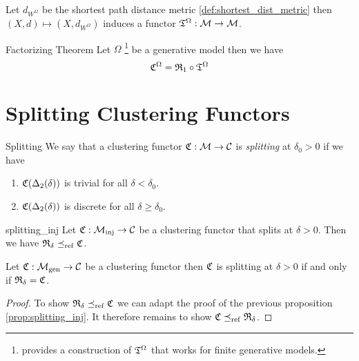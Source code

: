 \begin{myremark}{}{}
Let $d_{W^\Omega}$ be the shortest path distance metric \ref{def:shortest_dist_metric} then $(X,d) \mapsto (X,d_{W^\Omega})$ induces a functor $\mathfrak{T}^\Omega: \mathcal{M} \to \mathcal{M}$.
\end{myremark}

\begin{theorem}{Factorizing Theorem}{}
Let $\Omega$ \footnote{\cite{Carlsson2010} provides a construction of $\mathfrak{T}^\Omega$ that works for finite generative models.} be a generative model then we have
\begin{equation*}
\mathfrak{C}^\Omega = \mathfrak{R}_1 \circ \mathfrak{T}^\Omega
\end{equation*}
\end{theorem}

\section{Splitting Clustering Functors}

\begin{definition}{Splitting}{}
We say that a clustering functor $\mathfrak{C}: \mathcal{M} \to \mathcal{C}$ is \emph{splitting} at $\delta_0 > 0$ if we have

\begin{enumerate}
    \item $\mathfrak{C}(\Delta_2(\delta))$ is trivial for all $\delta < \delta_0$.
    \item $\mathfrak{C}(\Delta_2(\delta))$ is discrete for all $\delta \geq \delta_0$.
\end{enumerate}

\end{definition}

\begin{proposition}{}{splitting_inj}
Let $\mathfrak{C}: {\mathcal{M}_\mathrm{inj}} \to \mathcal{C}$ be a clustering functor that splits at $\delta > 0$. Then we have $\mathfrak{R}_\delta \preceq_\mathrm{ref} \mathfrak{C}$.
\end{proposition}

\begin{proposition}{}{}
Let $\mathfrak{C}: {\mathcal{M}_\mathrm{gen}} \to \mathcal{C}$ be a clustering functor then $\mathfrak{C}$ is splitting at $\delta > 0$ if and only if $\mathfrak{R}_\delta = \mathfrak{C}$.
\end{proposition}

\begin{proof}
To show $\mathfrak{R}_\delta \preceq_\mathrm{ref} \mathfrak{C}$ we can adapt the proof of the previous proposition \ref{prop:splitting_inj}. It therefore remains to show $\mathfrak{C} \preceq_\mathrm{ref} \mathfrak{R}_\delta$. \todo
\end{proof}

